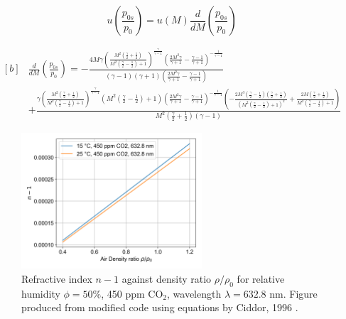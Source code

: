 \documentclass{article}
\begin{document}
\begin{equation}
    u\left( \frac{p_{0s}}{p_0} \right) = u(M) \frac{d}{dM}\left( \frac{p_{0s}}{p_0} \right)
\end{equation}

\begin{equation}
    \begin{aligned}[b]
    & \frac{d}{dM}\left( \frac{p_{0s}}{p_0} \right) = - \frac{4 M \gamma \left(\frac{M^{2} \left(\frac{\gamma}{2} + \frac{1}{2}\right)}{M^{2} \left(\frac{\gamma}{2} - \frac{1}{2}\right) + 1}\right)^{\frac{\gamma}{\gamma - 1}} \left(\frac{2 M^{2} \gamma}{\gamma + 1} - \frac{\gamma - 1}{\gamma + 1}\right)^{- \frac{1}{\gamma - 1}}}{\left(\gamma - 1\right) \left(\gamma + 1\right) \left(\frac{2 M^{2} \gamma}{\gamma + 1} - \frac{\gamma - 1}{\gamma + 1}\right)} \\
    & + \frac{\gamma \left(\frac{M^{2} \left(\frac{\gamma}{2} + \frac{1}{2}\right)}{M^{2} \left(\frac{\gamma}{2} - \frac{1}{2}\right) + 1}\right)^{\frac{\gamma}{\gamma - 1}} \left(M^{2} \left(\frac{\gamma}{2} - \frac{1}{2}\right) + 1\right) \left(\frac{2 M^{2} \gamma}{\gamma + 1} - \frac{\gamma - 1}{\gamma + 1}\right)^{- \frac{1}{\gamma - 1}} \left(- \frac{2 M^{3} \left(\frac{\gamma}{2} - \frac{1}{2}\right) \left(\frac{\gamma}{2} + \frac{1}{2}\right)}{\left(M^{2} \left(\frac{\gamma}{2} - \frac{1}{2}\right) + 1\right)^{2}} + \frac{2 M \left(\frac{\gamma}{2} + \frac{1}{2}\right)}{M^{2} \left(\frac{\gamma}{2} - \frac{1}{2}\right) + 1}\right)}{M^{2} \left(\frac{\gamma}{2} + \frac{1}{2}\right) \left(\gamma - 1\right)}
    \end{aligned}
    \label{eqn:dp0sr_dm}
\end{equation}


\begin{figure}[H]
    \centering
    \includegraphics[width=0.6\textwidth]{dry_air_15_rho_vs_n.png}
    \caption{Refractive index $n-1$ against density ratio $\rho/\rho_0$ for relative humidity $\phi = 50\%$, 450 ppm $ \text{CO}_2 $, wavelength $\lambda = 632.8$ nm. Figure produced from modified code \cite{refractiveindex_info} using equations by Ciddor, 1996 \cite{Ciddor:96}.}
    \label{fig:refractive_index_vs_density}
\end{figure}
\end{document}
